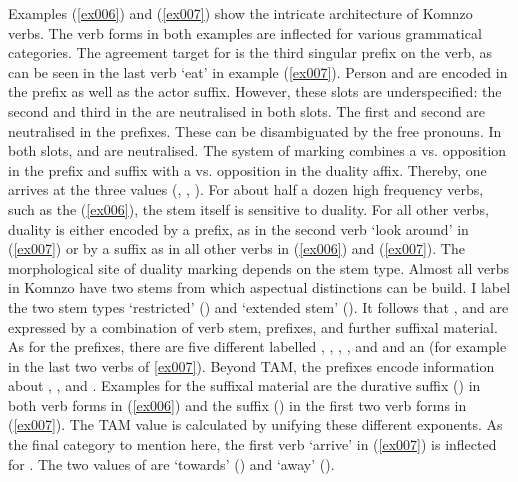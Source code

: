 Examples (\ref{ex006}) and (\ref{ex007}) show the intricate architecture of Komnzo verbs. The verb forms in both examples are inflected for various grammatical categories. The agreement target for  is the third  singular prefix on the verb, as can be seen in the last verb `eat' in example (\ref{ex007}). Person and  are encoded in the  prefix as well as the actor suffix. However, these slots are underspecified: the second and third  in the  are neutralised in both slots. The first  and second  are neutralised in the prefixes. These can be disambiguated by the free pronouns. In both slots,  and  are neutralised. The system of  marking combines a  vs.  opposition in the prefix and suffix with a  vs.  opposition in the duality affix. Thereby, one arrives at the three  values (\Sg, \Du, \Pl). For about half a dozen high frequency verbs, such as the  (\ref{ex006}), the stem itself is sensitive to duality. For all other verbs, duality is either encoded by a prefix, as in the second verb `look around' in (\ref{ex007}) or by a suffix as in all other verbs in (\ref{ex006}) and (\ref{ex007}). The morphological site of duality marking depends on the stem type. Almost all verbs in Komnzo have two stems from which aspectual distinctions can be build. I label the two stem types `restricted' ({\Rs}) and `extended stem' (\Ext). It follows that ,  and  are expressed by a combination of verb stem, prefixes, and further suffixal material. As for the prefixes, there are five different  labelled \Alph{}, \Bet{}, \Betaone{}, \Betatwo{}, and \Gam{} and an   (for example in the last two verbs of \ref{ex007}). Beyond TAM, the prefixes encode information about , , and . Examples for the suffixal material are the durative suffix (\Dur{}) in both verb forms in (\ref{ex006}) and the  suffix (\Pst{}) in the first two verb forms in (\ref{ex007}). The TAM value is calculated by unifying these different exponents. As the final category to mention here, the first verb `arrive' in (\ref{ex007}) is inflected for . The two values of  are  `towards' (\Venit) and  `away' (\Andat).

